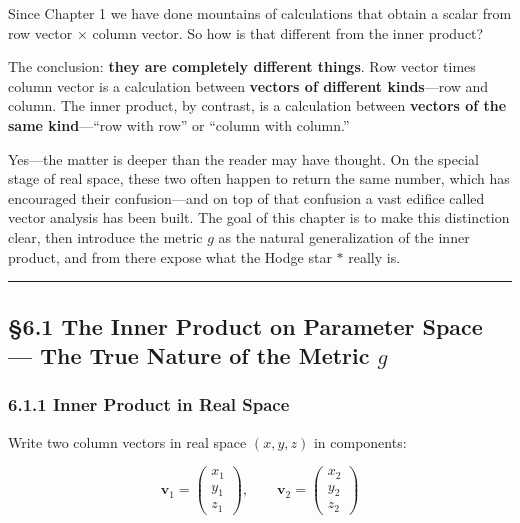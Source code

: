 Since Chapter 1 we have done mountains of calculations that obtain a
scalar from row vector × column vector. So how is that different from
the inner product?

The conclusion: \textbf{they are completely different things}. Row
vector times column vector is a calculation between
\textbf{vectors of different kinds}---row and column. The inner product,
by contrast, is a calculation between
\textbf{vectors of the same kind}---``row with row'' or ``column with
column.''

Yes---the matter is deeper than the reader may have thought. On the
special stage of real space, these two often happen to return the same
number, which has encouraged their confusion---and on top of that
confusion a vast edifice called vector analysis has been built. The goal
of this chapter is to make this distinction clear, then introduce the
metric \(g\) as the natural generalization of the inner product, and
from there expose what the Hodge star \(\ast\) really is.

\begin{center}\rule{0.5\linewidth}{0.5pt}\end{center}

\hypertarget{the-inner-product-on-parameter-space-the-true-nature-of-the-metric-g}{%
\subsection{\texorpdfstring{§6.1 The Inner Product on Parameter Space
--- The True Nature of the Metric
\(g\)}{§6.1 The Inner Product on Parameter Space --- The True Nature of the Metric g}}\label{the-inner-product-on-parameter-space-the-true-nature-of-the-metric-g}}

\hypertarget{inner-product-in-real-space}{%
\subsubsection{6.1.1 Inner Product in Real
Space}\label{inner-product-in-real-space}}

Write two column vectors in real space \((x,y,z)\) in components:

\[\mathbf{v}_1 = \begin{pmatrix} x_1 \\ y_1 \\ z_1 \end{pmatrix},\qquad \mathbf{v}_2 = \begin{pmatrix} x_2 \\ y_2 \\ z_2 \end{pmatrix}\]

